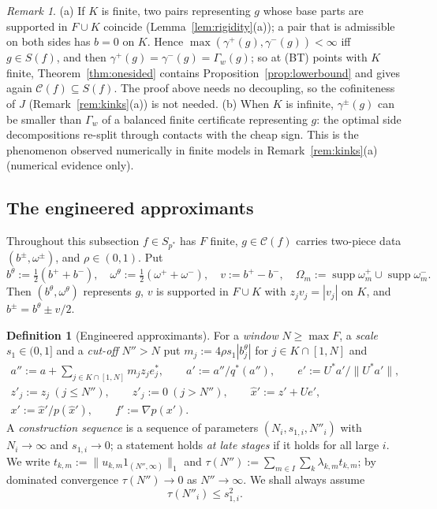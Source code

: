 \documentclass[10pt]{amsart}
\theoremstyle{definition}
\newtheorem{definition}[theorem]{Definition}
\theoremstyle{remark}
\newtheorem{remark}[theorem]{Remark}
\newcommand{\supp}{\operatorname{supp}}
\newcommand{\Cset}{\mathcal C}
\begin{document}
\begin{remark}\label{rem:onesided}
(a) If $K$ is finite, two pairs representing $g$ whose base parts are
supported in $F\cup K$ coincide (Lemma~\ref{lem:rigidity}(a)); a pair that
is admissible on both sides has $b=0$ on $K$.  Hence
$\max(\gamma^+(g),\gamma^-(g))<\infty$ iff $g\in S(f)$, and then
$\gamma^+(g)=\gamma^-(g)=\Gamma_w(g)$; so at \textup{(BT)} points with $K$ finite,
Theorem~\ref{thm:onesided} contains Proposition~\ref{prop:lowerbound} and
gives again $\Cset(f)\subseteq S(f)$.  The
proof above needs no decoupling, so the cofiniteness of $J$
(Remark~\ref{rem:kinks}(a)) is not needed.
(b) When $K$ is infinite, $\gamma^\pm(g)$ can be smaller than $\Gamma_w$ of
a balanced finite certificate representing $g$: the optimal side
decompositions re-split through contacts with the cheap sign.  This is the
phenomenon observed numerically in finite models in
Remark~\ref{rem:kinks}(a) (numerical evidence only).
\end{remark}

\subsection{The engineered approximants}
Throughout this subsection $f\in S_{p^*}$ has $F$ finite, $g\in\Cset(f)$
carries two-piece data $(b^\pm,\omega^\pm)$, and $\rho\in(0,1)$.  Put
\[
 b^\theta:=\tfrac12(b^++b^-),\quad \omega^\theta:=\tfrac12(\omega^++\omega^-),
 \quad v:=b^+-b^-,\quad \Omega_m:=\supp\omega^+_m\cup\supp\omega^-_m .
\]
Then $(b^\theta,\omega^\theta)$ represents $g$, $v$ is supported in $F\cup
K$ with $z_jv_j=|v_j|$ on $K$, and $b^\pm=b^\theta\pm v/2$.

\begin{definition}[Engineered approximants]\label{def:engineered}
For a \emph{window} $N\ge\max F$, a \emph{scale} $s_1\in(0,1]$ and a
\emph{cut-off} $N''>N$ put $m_j:=4\rho s_1|b^\theta_j|$ for $j\in
K\cap[1,N]$ and
\begin{gather*}
 a'':=a+\sum_{j\in K\cap[1,N]}m_jz_je_j^*,\qquad a':=a''/q^*(a''),\qquad
 e':=U^*a'/\|U^*a'\|,\\
 z'_j:=z_j\ (j\le N''),\qquad z'_j:=0\ (j>N''),\qquad \hat x':=z'+Ue',\\
 x':=\hat x'/p(\hat x'),\qquad f':=\nabla p(x').
\end{gather*}
A \emph{construction sequence} is a sequence of parameters
$(N_i,s_{1,i},N''_i)$ with $N_i\to\infty$ and $s_{1,i}\to0$; a statement
holds \emph{at late stages} if it holds for all large $i$.  We write
$t_{k,m}:=\|u_{k,m}1_{(N'',\infty)}\|_1$ and
$\tau(N''):=\sum_{m\in I}\sum_k\lambda_{k,m}t_{k,m}$; by dominated convergence
$\tau(N'')\to0$ as $N''\to\infty$.  We shall always assume
\begin{equation}\label{eq:N1}
 \tau(N''_i)\le s_{1,i}^2 .
\end{equation}
\end{definition}
\end{document}
